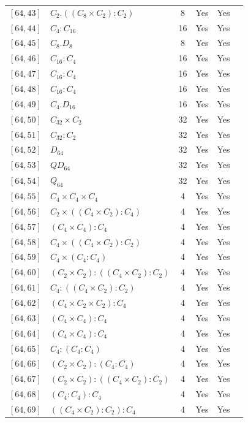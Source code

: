 \documentclass[12pt, a4paper]{article}
\theoremstyle{plain}
\theoremstyle{definition}
\begin{document}
\begin{longtable}{llcccl}
  $[64,43]$ & $C_2 . ((C_8 \times C_2) : C_2)$ & 8 & Yes & Yes \\
  $[64,44]$ & $C_4 : C_{16}$ & 16 & Yes & Yes \\
  $[64,45]$ & $C_8 . D_8$ & 8 & Yes & Yes \\
  $[64,46]$ & $C_{16} : C_4$ & 16 & Yes & Yes \\
  $[64,47]$ & $C_{16} : C_4$ & 16 & Yes & Yes \\
  $[64,48]$ & $C_{16} : C_4$ & 16 & Yes & Yes \\
  $[64,49]$ & $C_4 . D_{16}$ & 16 & Yes & Yes \\
  $[64,50]$ & $C_{32} \times C_2$ & 32 & Yes & Yes \\
  $[64,51]$ & $C_{32} : C_2$ & 32 & Yes & Yes \\
  $[64,52]$ & $D_{64}$ & 32 & Yes & Yes \\
  $[64,53]$ & $QD_{64}$ & 32 & Yes & Yes \\
  $[64,54]$ & $Q_{64}$ & 32 & Yes & Yes \\
  $[64,55]$ & $C_4 \times C_4 \times C_4$ & 4 & Yes & Yes \\
  $[64,56]$ & $C_2 \times ((C_4 \times C_2) : C_4)$ & 4 & Yes & Yes \\
  $[64,57]$ & $(C_4 \times C_4) : C_4$ & 4 & Yes & Yes \\
  $[64,58]$ & $C_4 \times ((C_4 \times C_2) : C_2)$ & 4 & Yes & Yes \\
  $[64,59]$ & $C_4 \times (C_4 : C_4)$ & 4 & Yes & Yes \\
  $[64,60]$ & $(C_2 \times C_2) : ((C_4 \times C_2) : C_2)$ & 4 & Yes & Yes \\
  $[64,61]$ & $C_4 : ((C_4 \times C_2) : C_2)$ & 4 & Yes & Yes \\
  $[64,62]$ & $(C_4 \times C_2 \times C_2) : C_4$ & 4 & Yes & Yes \\
  $[64,63]$ & $(C_4 \times C_4) : C_4$ & 4 & Yes & Yes \\
  $[64,64]$ & $(C_4 \times C_4) : C_4$ & 4 & Yes & Yes \\
  $[64,65]$ & $C_4 : (C_4 : C_4)$ & 4 & Yes & Yes \\
  $[64,66]$ & $(C_2 \times C_2) : (C_4 : C_4)$ & 4 & Yes & Yes \\
  $[64,67]$ & $(C_2 \times C_2) : ((C_4 \times C_2) : C_2)$ & 4 & Yes & Yes \\
  $[64,68]$ & $(C_4 : C_4) : C_4$ & 4 & Yes & Yes \\
  $[64,69]$ & $((C_4 \times C_2) : C_2) : C_4$ & 4 & Yes & Yes \\

\end{longtable}
\end{document}
